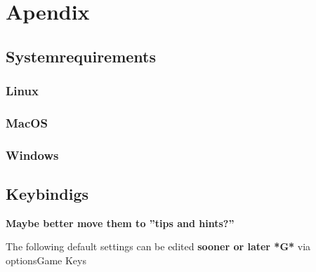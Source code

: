 
\chapter{Apendix}

\section{Systemrequirements}
\subsection{Linux}
\subsection{MacOS}
\subsection{Windows}

\section{Keybindigs}
\textbf{Maybe better move them to ''tips and hints?''}

The following default settings can be edited \textbf{sooner or later *G*} via options\hookrightarrow Game \hookrightarrow Keys\\
